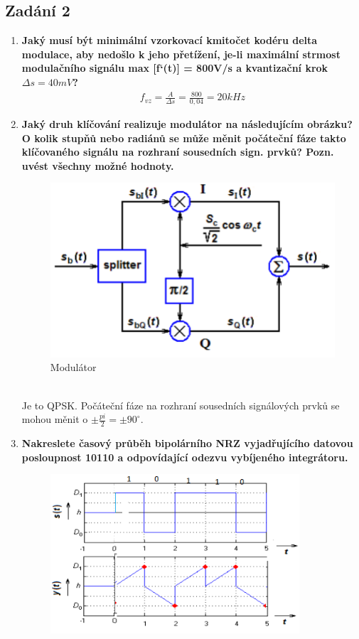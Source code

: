 \subsection{Zadání 2}

\begin{enumerate}
    \item \textbf{Jaký musí být minimální vzorkovací kmitočet kodéru delta modulace, aby nedošlo k jeho
    přetížení, je-li maximální strmost modulačního signálu max [f`(t)] = 800V/s a kvantizační
    krok \(\Delta s = 40mV\)?}
    \begin{align*}
        f_{vz} = \frac{A}{\Delta s} = \frac{800}{0,04} = 20kHz
    \end{align*}
    \item \textbf{Jaký druh klíčování realizuje modulátor na následujícím obrázku? O kolik stupňů nebo
    radiánů se může měnit počáteční fáze takto klíčovaného signálu na rozhraní sousedních
    sign. prvků? Pozn. uvést všechny možné hodnoty.}\\
    \begin{figure}[h]
        \centering
        \includegraphics[scale = 0.3]{images/QPSK}
        \caption{Modulátor}
    \end{figure}\\
    Je to QPSK. Počáteční fáze na rozhraní sousedních signálových prvků se mohou měnit o \(\pm \frac{pi}{2} = \pm 90^{\circ}\).
    \item \textbf{Nakreslete časový průběh bipolárního NRZ vyjadřujícího datovou posloupnost 10110 a
    odpovídající odezvu vybíjeného integrátoru.}
    \begin{figure}[h]
        \centering
        \includegraphics[scale = 0.7]{images/VybInteg.png}

\end{figure}
\end{enumerate}
